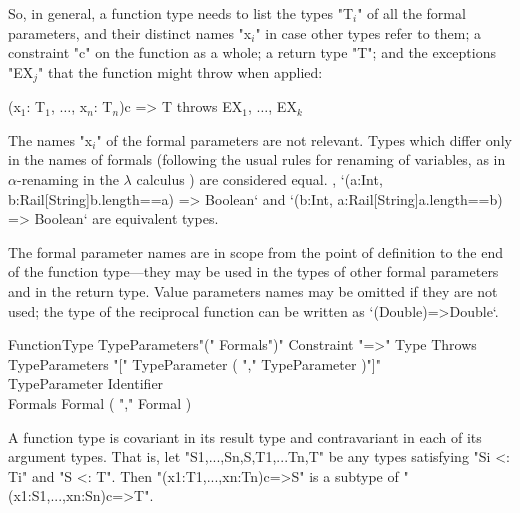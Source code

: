 {{So, in general, a function type needs to list the types 
\xcdmath"T$_i$"
of all the formal parameters,
and their distinct names \xcdmath"x$_i$" in case other types refer to them; a
constraint 
\xcd"c" on the
function as a whole; a return type \xcd"T"; and the exceptions \xcdmath"EX$_j$"
that the function might throw when applied: 



\begin{xtenmath}
(x$_1$: T$_1$, $\dots$, x$_n$: T$_n$){c} => T
        throws EX$_1$, $\dots$, EX$_k$
\end{xtenmath}


The names \xcdmath"x$_i$" of the formal parameters are not relevant.  Types
which differ only in the names of formals (following the usual rules for
renaming of variables, as in {$\alpha$}-renaming in the {$\lambda$} calculus
) are considered equal.  \Eg, 
\xcd`(a:Int, b:Rail[String]{b.length==a}) => Boolean`
and 
\xcd`(b:Int, a:Rail[String]{a.length==b}) => Boolean`
are equivalent types.

The formal parameter names are in scope from the point of definition to the
end of the function type---they may be used in the types of other formal parameters
and in the return type. 
Value parameters names may be
omitted if they are not used; the type of the reciprocal function can be
written as
\xcd`(Double)=>Double`. 

\begin{grammar}
FunctionType \: TypeParameters\opt \xcd"(" Formals\opt \xcd")" Constraint\opt
\xcd"=>" Type Throws\opt \\
TypeParameters \: \xcd"[" TypeParameter ( \xcd"," TypeParameter
)\star \xcd"]" \\
TypeParameter \: Identifier \\
Formals \: Formal ( \xcd"," Formal )\star \\
\end{grammar}






A function type is covariant in its result type and contravariant in
each of its argument types. That is, let 
\xcd"S1,...,Sn,S,T1,...Tn,T" be any
types satisfying \xcd"Si <: Ti" and \xcd"S <: T". Then
\xcd"(x1:T1,...,xn:Tn){c}=>S" is a subtype of
\xcd"(x1:S1,...,xn:Sn){c}=>T".



}}
